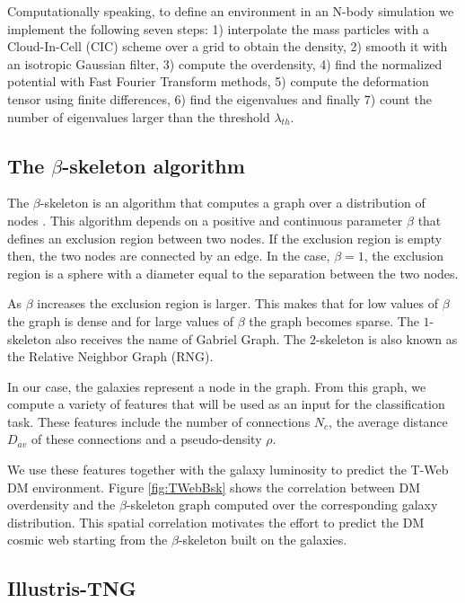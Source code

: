 \documentclass[usenatbib]{mnras}
\begin{document}
Computationally speaking, to define an environment in an N-body simulation 
we implement the following seven steps: 1) interpolate the mass particles with a Cloud-In-Cell
(CIC) scheme over a grid to obtain the density, 2) smooth it with an isotropic Gaussian filter,
3) compute the overdensity, 4) find the normalized potential with Fast Fourier Transform
methods, 5) compute the deformation tensor using finite differences, 6) find the eigenvalues and
finally 7) count the number of eigenvalues larger than the threshold $\lambda_{th}$.

\subsection{The $\beta$-skeleton algorithm}
The $\beta$-skeleton is an algorithm that computes a graph over a distribution of nodes
\citep{Kirkpatrick1985, Fang2019}. 
This algorithm depends on a positive and continuous parameter $\beta$ that defines an exclusion
region between two nodes.
If the exclusion region is empty then, the two nodes are connected by an edge. 
In the case, $\beta=1$, the exclusion region is a sphere with a diameter equal to the separation
between the two nodes. 

As $\beta$ increases the exclusion region is larger.
This makes that for low values of $\beta$ the graph is dense and for large values of $\beta$
the graph becomes sparse.
The $1$-skeleton also receives the name of Gabriel Graph. 
The $2$-skeleton is also known as the Relative Neighbor Graph (RNG).

In our case, the galaxies represent a node in the graph.
From this graph, we compute a variety of features that will be used as an input
for the classification task.
These features include the number of connections $N_{c}$, the average distance $D_{av}$ of these connections and a pseudo-density $\rho$.

We use these features together with the galaxy luminosity to predict the T-Web DM environment.
Figure \ref{fig:TWebBsk} shows the correlation between DM overdensity and the $\beta$-skeleton 
graph computed over the corresponding galaxy distribution.
This spatial correlation motivates the effort to predict the DM cosmic web starting from
the $\beta$-skeleton built on the galaxies.

\subsection{Illustris-TNG}
\end{document}
